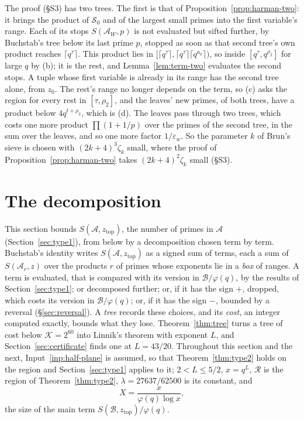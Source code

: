 \documentclass[11pt]{article}
\theoremstyle{definition}
\begin{document}
The proof (\S S3) has two trees. The first is that of Proposition~\ref{prop:harman-two}: it brings the product of
$\mathcal S_0$ and of the largest small primes into the first variable's range. Each of its stops $S(\mathcal A_W, p)$
is not evaluated but sifted further, by Buchstab's tree below its last prime $p$, stopped as soon as that second tree's
own product reaches $\lceil q^\tau \rceil$. This product lies in $[\lceil q^\tau \rceil, \lceil q^\tau \rceil \lceil
q^{a_0} \rceil)$, so inside $[q^\tau, q^{\rho_2}]$ for large $q$ by (b); it is the rest, and Lemma~\ref{lem:term-two}
evaluates the second stops. A tuple whose first variable is already in its range has the second tree alone, from
$z_0$. The rest's range no longer depends on the term, so (c) asks the region for every rest in $[\tau, \rho_2]$, and
the
leaves' new primes, of both trees, have a product below $4q^{t + \rho_2}$, which is (d). The leaves pass through two
trees, which costs one more product $\prod (1 + 1/p)$ over the primes of the second tree, in the sum over the leaves,
and so one more factor $1/\varepsilon_w$. So the parameter $k$ of Brun's sieve is chosen with $(2k + 4)^3 \zeta_k$
small, where the proof of Proposition~\ref{prop:harman-two} takes $(2k + 4)^2 \zeta_k$ small (\S S3).

\section{The decomposition}\label{sec:decomp}

This section bounds $S(\mathcal A, z_{\mathrm{top}})$, the number of primes in $\mathcal A$ (Section~\ref{sec:type1}),
from below by a decomposition chosen term by term. Buchstab's
identity writes $S(\mathcal A, z_{\mathrm{top}})$ as a signed sum of terms, each a sum of $S(\mathcal A_r, z)$ over the
products $r$ of primes whose exponents lie in a \emph{box} of ranges. A term is evaluated, that is compared with its
version in $\mathcal B/\varphi(q)$, by the results of Section~\ref{sec:type1}; or decomposed further; or, if it has the
sign $+$, dropped, which costs its version in $\mathcal B/\varphi(q)$; or, if it has the sign $-$, bounded by a reversal
(\S\ref{sec:reversal}). A \emph{tree} records these choices, and its \emph{cost}, an integer computed exactly, bounds
what they lose. Theorem~\ref{thm:tree} turns a tree of cost below $\mathcal K = 2^{60}$ into Linnik's theorem with
exponent $L$, and Section~\ref{sec:certificate} finds one at $L = 43/20$. Throughout this section and the next,
Input~\ref{inp:half-plane} is assumed, so that Theorem~\ref{thm:type2} holds on the region and
Section~\ref{sec:type1} applies to it; $2 < L \le 5/2$, $x = q^L$,
$\mathcal R$ is the region of Theorem~\ref{thm:type2}, $\lambda = 27637/62500$ is its constant, and
\[
  X = \frac{x}{\varphi(q) \log x},
\]
the size of the main term $S(\mathcal B, z_{\mathrm{top}})/\varphi(q)$.
\end{document}

